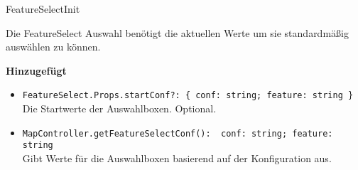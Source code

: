\begin{Change}{FeatureSelectInit}
    
    Die FeatureSelect Auswahl benötigt die aktuellen Werte um sie standardmäßig auswählen zu können.
    
    \bigskip
    \textbf{Hinzugefügt}
    \begin{itemize}
        \item \texttt{FeatureSelect.Props.startConf?: \{ conf: string; feature: string \}}
        \\ Die Startwerte der Auswahlboxen. Optional.
        \item \texttt{MapController.getFeatureSelectConf(): { conf: string; feature: string }}
        \\ Gibt Werte für die Auswahlboxen basierend auf der Konfiguration aus.
    \end{itemize}

\end{Change}

